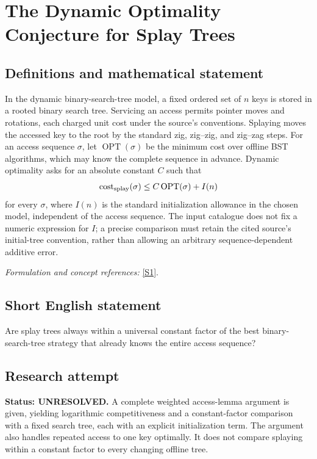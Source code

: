 \documentclass[11pt]{article}
\begin{document}
\section*{\texorpdfstring{The Dynamic Optimality Conjecture for Splay Trees}{The Dynamic Optimality Conjecture for Splay Trees}}\label{statement}
\subsection{Definitions and mathematical statement}
In the dynamic binary-search-tree model, a fixed ordered set of $n$ keys is stored in a rooted binary search tree. Servicing an access permits pointer moves and rotations, each charged unit cost under the source's conventions. Splaying moves the accessed key to the root by the standard zig, zig--zig, and zig--zag steps. For an access sequence $\sigma$, let $\operatorname{OPT}(\sigma)$ be the minimum cost over offline BST algorithms, which may know the complete sequence in advance. Dynamic optimality asks for an absolute constant $C$ such that
\[
 \operatorname{cost}_{\rm splay}(\sigma)
 \le C\operatorname{OPT}(\sigma)+I(n)
\]
for every $\sigma$, where $I(n)$ is the standard initialization allowance in the chosen model, independent of the access sequence. The input catalogue does not fix a numeric expression for $I$; a precise comparison must retain the cited source's initial-tree convention, rather than allowing an arbitrary sequence-dependent additive error.
\par\smallskip\textit{Formulation and concept references:} \href{https://arxiv.org/abs/2607.18498}{[S1]}.

\subsection{Short English statement}
Are splay trees always within a universal constant factor of the best binary-search-tree strategy that already knows the entire access sequence?
\subsection{Research attempt}
\textbf{Status: UNRESOLVED.} A complete weighted access-lemma argument is given, yielding logarithmic competitiveness and a constant-factor comparison with a fixed search tree, each with an explicit initialization term. The argument also handles repeated access to one key optimally. It does not compare splaying within a constant factor to every changing offline tree.
\end{document}
